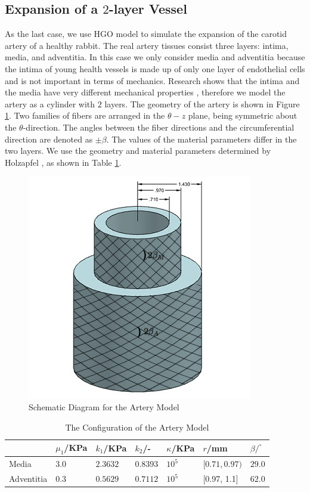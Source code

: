 \subsection{Expansion of a $2$-layer Vessel}
As the last case, we use HGO model to simulate the expansion of the carotid artery of a healthy rabbit. The real artery tissues consist three layers: intima, media, and adventitia. In this case we only consider media and adventitia because the intima of young health vessels is made up of only one layer of endothelial cells and is not important in terms of mechanics. Research shows that the intima and the media have very different mechanical properties \cite{Keitzer, Fung3}, therefore we model the artery as a cylinder with $2$ layers. The geometry of the artery is shown in Figure \ref{fig:vessel_schematic3}. Two families of fibers are arranged in the $\theta-z$ plane, being symmetric about the $\theta$-direction. The angles between the fiber directions and the circumferential direction are denoted as $\pm\beta$. The values of the material parameters differ in the two layers. We use the geometry and material parameters determined by Holzapfel \cite{Holzapfel2}, as shown in Table \ref{table:artery}. 

\begin{figure}[H]
\centering
\includegraphics[width=.4\textwidth]{./figures/vessel_schematic3.png}
\caption{Schematic Diagram for the Artery Model}
\label{fig:vessel_schematic3}
\end{figure}

\begin{table}[H]
\centering
\caption{The Configuration of the Artery Model}
\label{table:artery}
\begin{tabular}{ l l l l l l l}
\hline
& $\mu_1$/KPa & $k_1$/KPa & $k_2$/- & $\kappa$/KPa & $r$/mm & $\beta/^\circ$ \\
 \hline
 Media &   $3.0$ & $2.3632$ & $0.8393$ & $10^5$ & $[0.71, 0.97)$ & $29.0$\\
 Adventitia & $0.3$ & $0.5629$ & $0.7112$ & $10^5$ & [0.97, 1.1] & $62.0$\\
 \hline
\end{tabular}
\end{table}

